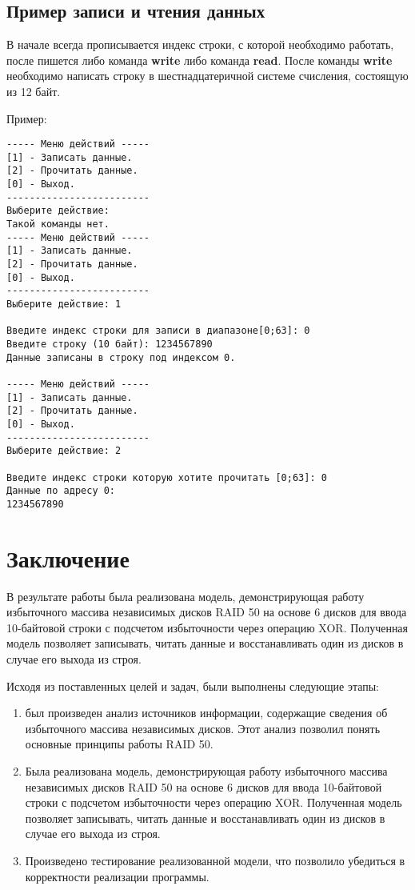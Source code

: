 \documentclass[10pt,a4paper,final]{article} %
\begin{document}
\subsection{Пример записи и чтения данных}
В начале всегда прописывается индекс строки, с которой необходимо работать, после пишется либо команда \textbf{write} либо команда \textbf{read}. После команды \textbf{write} необходимо написать строку в шестнадцатеричной системе счисления, состоящую из 12 байт.

Пример:
\begin{lstlisting}
----- Меню действий -----
[1] - Записать данные.
[2] - Прочитать данные.
[0] - Выход.
-------------------------
Выберите действие: 
Такой команды нет.
----- Меню действий -----
[1] - Записать данные.
[2] - Прочитать данные.
[0] - Выход.
-------------------------
Выберите действие: 1

Введите индекс строки для записи в диапазоне[0;63]: 0
Введите строку (10 байт): 1234567890
Данные записаны в строку под индексом 0.

----- Меню действий -----
[1] - Записать данные.
[2] - Прочитать данные.
[0] - Выход.
-------------------------
Выберите действие: 2

Введите индекс строки которую хотите прочитать [0;63]: 0
Данные по адресу 0: 
1234567890

\end{lstlisting}

\newpage
\section*{Заключение}

В результате работы была реализована модель, демонстрирующая работу избыточного массива независимых дисков RAID 50 на основе 6 дисков для ввода 10-байтовой строки с подсчетом избыточности через операцию XOR. Полученная модель позволяет записывать, читать данные и восстанавливать один из дисков в случае его выхода из строя.

Исходя из поставленных целей и задач, были выполнены следующие этапы:
\begin{enumerate}
	\item был произведен анализ источников информации, содержащие сведения об избыточного массива независимых дисков. Этот анализ позволил понять основные принципы работы RAID 50.
	\item Была реализована модель, демонстрирующая работу избыточного массива независимых дисков RAID 50 на основе 6 дисков для ввода 10-байтовой строки с подсчетом избыточности через операцию XOR. Полученная модель позволяет записывать, читать данные и восстанавливать один из дисков в случае его выхода из строя.
	\item  Произведено тестирование реализованной модели, что позволило убедиться в корректности реализации программы.
\end{enumerate}
\end{document}
